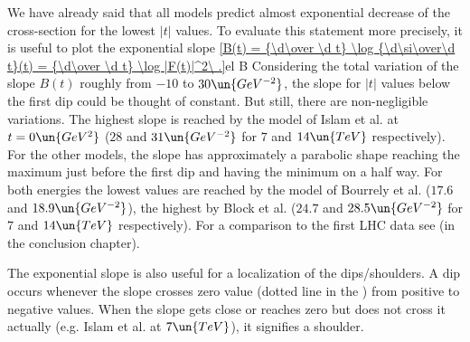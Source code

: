 

We have already said that all models predict almost exponential decrease of the cross-section for the lowest $|t|$ values. To evaluate this statement more precisely, it is useful to plot the exponential slope
\eqref{B(t) = {\d\over \d t} \log {\d\si\over\d t}(t) = {\d\over \d t} \log |F(t)|^2\ .}{el B}
Considering the total variation of the slope $B(t)$ roughly from $-10$ to $30\un{GeV^{-2}}$, the slope for $|t|$ values below the first dip could be thought of constant. But still, there are non-negligible variations. The highest slope is reached by the model of Islam et al. at $t=0\un{GeV^2}$ ($28$ and $31\un{GeV^{-2}}$ for $7$ and $14\un{TeV}$ respectively). For the other models, the slope has approximately a parabolic shape reaching the maximum just before the first dip and having the minimum on a half way. For both energies the lowest values are reached by the model of Bourrely et al. ($17.6$ and $18.9\un{GeV^{-2}}$), the highest by Block et al. ($24.7$ and $28.5\un{GeV^{-2}}$ for $7$ and $14\un{TeV}$ respectively). For a comparison to the first LHC data see  (in the conclusion chapter).

The exponential slope is also useful for a localization of the dips/shoulders. A dip occurs whenever the slope crosses zero value (dotted line in the ) from positive to negative values. When the slope gets close or reaches zero but does not cross it actually (e.g. Islam et al. at $7\un{TeV}$), it signifies a shoulder.


